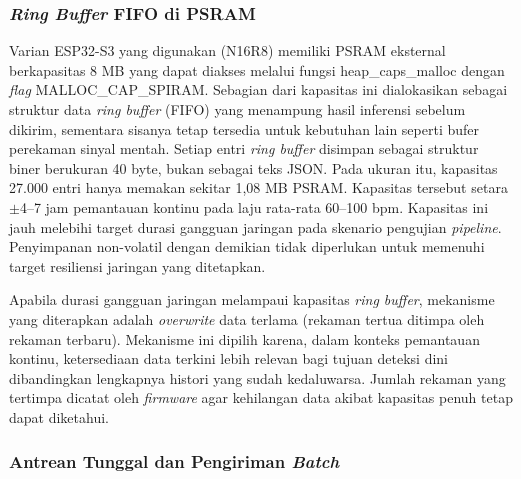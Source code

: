 \subsubsection{\textit{Ring Buffer} FIFO di PSRAM}

Varian ESP32-S3 yang digunakan (N16R8) memiliki PSRAM eksternal berkapasitas 8 MB
yang dapat diakses melalui fungsi heap\_caps\_malloc dengan \textit{flag} MALLOC\_CAP\_SPIRAM.
Sebagian dari kapasitas ini dialokasikan sebagai struktur data
\textit{ring buffer} (FIFO) yang menampung hasil inferensi sebelum dikirim, sementara
sisanya tetap tersedia untuk kebutuhan lain seperti bufer perekaman sinyal mentah.
Setiap entri \textit{ring buffer} disimpan sebagai struktur biner berukuran 40 byte,
bukan sebagai teks JSON. Pada ukuran itu, kapasitas 27.000 entri hanya memakan sekitar 1,08 MB
PSRAM. Kapasitas tersebut setara $\pm$4--7 jam pemantauan kontinu pada laju rata-rata
60--100 bpm.
Kapasitas ini jauh melebihi target durasi gangguan jaringan pada skenario
pengujian \textit{pipeline}. Penyimpanan
non-volatil dengan demikian tidak diperlukan untuk memenuhi target resiliensi jaringan yang ditetapkan.

Apabila durasi gangguan jaringan melampaui kapasitas \textit{ring buffer}, mekanisme
yang diterapkan adalah \textit{overwrite} data terlama (rekaman tertua ditimpa oleh
rekaman terbaru). Mekanisme ini dipilih karena, dalam konteks pemantauan kontinu,
ketersediaan data terkini lebih relevan bagi tujuan deteksi dini dibandingkan lengkapnya
histori yang sudah kedaluwarsa. Jumlah rekaman yang tertimpa dicatat oleh \textit{firmware}
agar kehilangan data akibat kapasitas penuh tetap dapat diketahui.

\subsubsection{Antrean Tunggal dan Pengiriman \textit{Batch}}

